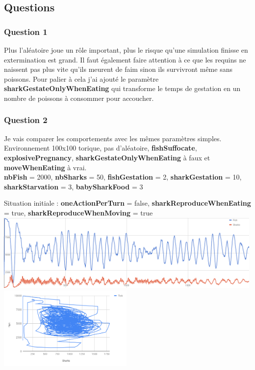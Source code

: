 \documentclass[11pt,a4paper,oneside]{report}
\begin{document}
\subsection*{Questions}
\subsubsection*{Question 1}
Plus l'aléatoire joue un rôle important, plus le risque qu'une simulation finisse en extermination est grand. Il faut également faire attention à ce que les requins ne naissent pas plus vite qu'ils meurent de faim sinon ils survivront même sans poissons. Pour palier à cela j'ai ajouté le paramètre \textbf{sharkGestateOnlyWhenEating} qui transforme le temps de gestation en un nombre de poissons à consommer pour accoucher.
\subsubsection*{Question 2}
Je vais comparer les comportements avec les mêmes paramètres simples. Environnement 100x100 torique, pas d'aléatoire, \textbf{fishSuffocate}, \textbf{explosivePregnancy}, \textbf{sharkGestateOnlyWhenEating} à faux et \textbf{moveWhenEating} à vrai.\\
\textbf{nbFish} = 2000, \textbf{nbSharks} = 50, \textbf{fishGestation} = 2, \textbf{sharkGestation} = 10, \textbf{sharkStarvation} = 3, \textbf{babySharkFood} = 3

\begin{center}
Situation initiale : \textbf{oneActionPerTurn} = false, \textbf{sharkReproduceWhenEating} = true, \textbf{sharkReproduceWhenMoving} = true
\includegraphics[width=500px]{wator_0}\\
\includegraphics[width=250px]{wator_0b}
\end{center}
\end{document}

